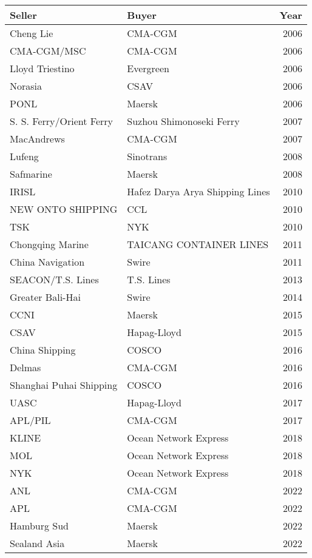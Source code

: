 
\begin{tabular}[t]{llr}
\toprule
Seller & Buyer & Year\\
\midrule
Cheng Lie & CMA-CGM & 2006\\
CMA-CGM/MSC & CMA-CGM & 2006\\
Lloyd Triestino & Evergreen & 2006\\
Norasia & CSAV & 2006\\
PONL & Maersk & 2006\\
S. S. Ferry/Orient Ferry & Suzhou Shimonoseki Ferry & 2007\\
MacAndrews & CMA-CGM & 2007\\
Lufeng & Sinotrans & 2008\\
Safmarine & Maersk & 2008\\
IRISL & Hafez Darya Arya Shipping Lines & 2010\\
NEW ONTO SHIPPING & CCL & 2010\\
TSK & NYK & 2010\\
Chongqing Marine & TAICANG CONTAINER LINES & 2011\\
China Navigation & Swire & 2011\\
SEACON/T.S. Lines & T.S. Lines & 2013\\
Greater Bali-Hai & Swire & 2014\\
CCNI & Maersk & 2015\\
CSAV & Hapag-Lloyd & 2015\\
China Shipping & COSCO & 2016\\
Delmas & CMA-CGM & 2016\\
Shanghai Puhai Shipping & COSCO & 2016\\
UASC & Hapag-Lloyd & 2017\\
APL/PIL & CMA-CGM & 2017\\
KLINE & Ocean Network Express & 2018\\
MOL & Ocean Network Express & 2018\\
NYK & Ocean Network Express & 2018\\
ANL & CMA-CGM & 2022\\
APL & CMA-CGM & 2022\\
Hamburg Sud & Maersk & 2022\\
Sealand Asia & Maersk & 2022\\
\bottomrule
\end{tabular}
